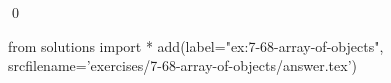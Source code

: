 
\begin{ex}
  \label{ex:7-68-array-of-objects}
  
  \qed
\end{ex}
\begin{python0}
from solutions import *
add(label="ex:7-68-array-of-objects",
    srcfilename='exercises/7-68-array-of-objects/answer.tex')
\end{python0}
